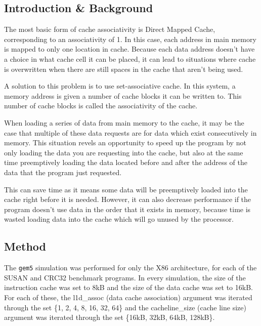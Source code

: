 
\subsection{Introduction \& Background}

The most basic form of cache associativity is Direct Mapped Cache, corresponding to an
associativity of 1.
In this case, each address in main memory is mapped to only one location in cache.
Because each data address doesn't have a choice in what cache cell it can be placed,
it can lead to situations where cache is overwritten when there are still spaces in
the cache that aren't being used.

A solution to this problem is to use set-associative cache.
In this system, a memory address is given a number of cache blocks it can be written to.
This number of cache blocks is called the associativity of the cache.

When loading a series of data from main memory to the cache, it may be the case that
multiple of these data requests are for data which exist consecutively in memory.
This situation revels an opportunity to speed up the program by not only loading
the data you are requesting into the cache, but also at the same time preemptively loading
the data located before and after the address of the data that the program just requested.

This can save time as it means some data will be preemptively loaded into the cache right
before it is needed.
However, it can also decrease performance if the program doesn't use data in the order that
it exists in memory, because time is wasted loading data into the cache which will go unused
by the processor.

\subsection{Method}

The \texttt{gem5} simulation was performed for only the X86 architecture, for each of the
SUSAN and CRC32 benchmark programs.
In every simulation, the size of the instruction cache was set to 8kB and the size
of the data cache was set to 16kB.
For each of these, the l1d\_assoc (data cache association) argument was iterated
through the set \{1, 2, 4, 8, 16, 32, 64\} and the cacheline\_size (cache line size) argument
was iterated through the set \{16kB, 32kB, 64kB, 128kB\}.

